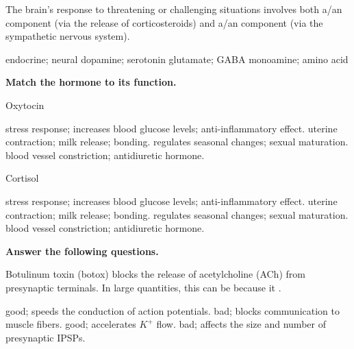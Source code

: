 \documentclass[answers]{exam}
\begin{document}
\begin{questions}

\question The brain's response to threatening or challenging situations involves both a/an \fillin component (via the release of corticosteroids) and a/an \fillin component (via the sympathetic nervous system).
\begin{choices}
\correctchoice endocrine; neural
\choice dopamine; serotonin
\choice glutamate; GABA
\choice monoamine; amino acid
\end{choices}

\vspace{.75cm}
\textbf{Match the hormone to its function.}

\question Oxytocin
\begin{choices}
\choice stress response; increases blood glucose levels; anti-inflammatory effect.
\correctchoice uterine contraction; milk release; bonding.
\choice regulates seasonal changes; sexual maturation.
\choice blood vessel constriction; antidiuretic hormone.
\end{choices}

\question Cortisol
\begin{choices}
\correctchoice stress response; increases blood glucose levels; anti-inflammatory effect.
\choice uterine contraction; milk release; bonding.
\choice regulates seasonal changes; sexual maturation.
\choice blood vessel constriction; antidiuretic hormone.
\end{choices}


\newpage

\textbf{Answer the following questions.}

\question Botulinum toxin (botox) blocks the release of acetylcholine (ACh) from presynaptic terminals. In large quantities, this can be \fillin because it \fillin.
\begin{choices}
\choice  good; speeds the conduction of action potentials.
\correctchoice  bad; blocks communication to muscle fibers.
\choice  good; accelerates $K^+$ flow.
\choice  bad; affects the size and number of presynaptic IPSPs.
\end{choices}


\end{questions}
\end{document}
